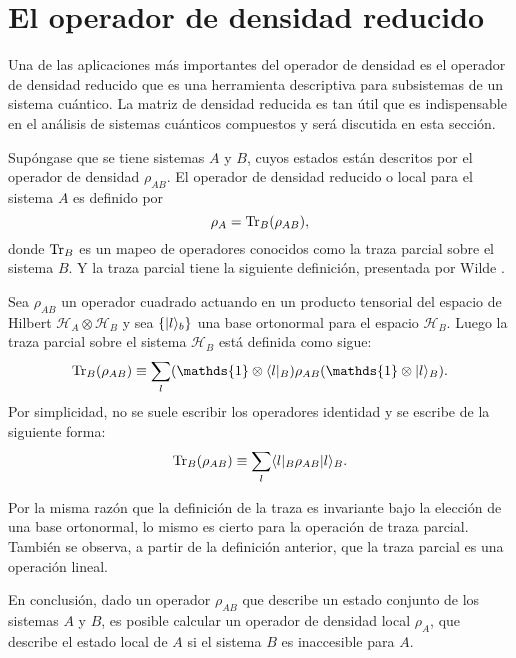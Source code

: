 \section{El operador de densidad reducido} %

Una de las aplicaciones más importantes del operador de densidad es el operador de densidad reducido que es una herramienta descriptiva para subsistemas de un sistema cuántico. La matriz de densidad reducida es tan útil que es indispensable en el análisis de sistemas cuánticos compuestos y será discutida en esta sección.


Supóngase que se tiene sistemas $A$ y $B$, cuyos estados están descritos por el operador de densidad $\rho_{AB}$. El operador de densidad reducido o local para el sistema $A$ es definido por  \begin{equation}
	\rho_A={\rm Tr}_B(\rho_{AB}),
\end{equation} donde ${\rm Tr}_B$ es un mapeo de operadores conocidos como la traza parcial sobre el sistema $B$. Y la traza parcial tiene la siguiente definición, presentada por Wilde {\cite{wilde2011classical}}.

\begin{definition}
	
	Sea  $ \rho_{AB}$ un operador cuadrado actuando en un producto tensorial del espacio de Hilbert $\mathcal{H}_A \otimes \mathcal{ H}_B$ y sea $\{|l\rangle_b\}$ una base ortonormal para el espacio $\mathcal{H}_B$. Luego la traza parcial sobre el sistema $\mathcal{H}_B$ está definida como sigue: \begin{equation}
		\tr_B(\rho_{AB})\equiv\sum_{l} (\mathds{1}\otimes\la l|_B)\rho_{AB}(\mathds{1}\otimes|l\ra_B).	
	\end{equation} Por simplicidad, no se suele escribir los operadores identidad y se escribe de la siguiente forma:
\begin{equation}
	{\rm Tr}_B(\rho_{AB})\equiv\sum_{l} \langle l|_B\rho_{AB}|l\rangle_B.
\end{equation}

	\end{definition}


Por la misma razón que la definición de la traza es invariante bajo la elección de una base ortonormal, lo mismo es cierto para la operación de traza parcial. También se observa, a partir de la definición anterior, que la traza parcial es una operación lineal.


En conclusión, dado un operador $\rho_{AB}$ que describe un estado conjunto de los sistemas $A$ y $B$, es posible calcular un operador de densidad local $\rho_A$, que describe el estado local de $A$ si el sistema $B$ es inaccesible para $A$.


